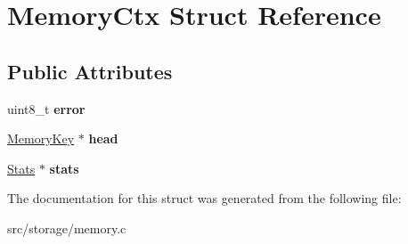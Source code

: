 \hypertarget{struct_memory_ctx}{}\section{Memory\+Ctx Struct Reference}
\label{struct_memory_ctx}
\subsection*{Public Attributes}
\begin{DoxyCompactItemize}
\item 
\hypertarget{struct_memory_ctx_a73340f3d3f2a85a235a7ff697369a59e}{}uint8\+\_\+t {\bfseries error}\label{struct_memory_ctx_a73340f3d3f2a85a235a7ff697369a59e}

\item 
\hypertarget{struct_memory_ctx_a3919435ed5d1230330b2e4d085510fd7}{}\hyperlink{struct_memory_key}{Memory\+Key} $\ast$ {\bfseries head}\label{struct_memory_ctx_a3919435ed5d1230330b2e4d085510fd7}

\item 
\hypertarget{struct_memory_ctx_a168100afeb2b0d3e83600c79262df4ae}{}\hyperlink{struct_stats}{Stats} $\ast$ {\bfseries stats}\label{struct_memory_ctx_a168100afeb2b0d3e83600c79262df4ae}

\end{DoxyCompactItemize}


The documentation for this struct was generated from the following file\+:\begin{DoxyCompactItemize}
\item 
src/storage/memory.\+c\end{DoxyCompactItemize}
